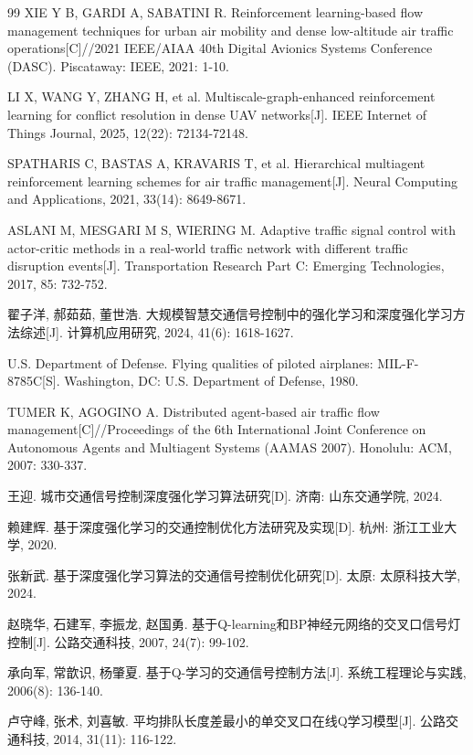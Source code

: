 \documentclass[12pt,a4paper,UTF8]{ctexart}
\begin{document}
\begin{thebibliography}{99}
 XIE Y B, GARDI A, SABATINI R. Reinforcement learning-based flow management techniques for urban air mobility and dense low-altitude air traffic operations[C]//2021 IEEE/AIAA 40th Digital Avionics Systems Conference (DASC). Piscataway: IEEE, 2021: 1-10.

 LI X, WANG Y, ZHANG H, et al. Multiscale-graph-enhanced reinforcement learning for conflict resolution in dense UAV networks[J]. IEEE Internet of Things Journal, 2025, 12(22): 72134-72148.

 SPATHARIS C, BASTAS A, KRAVARIS T, et al. Hierarchical multiagent reinforcement learning schemes for air traffic management[J]. Neural Computing and Applications, 2021, 33(14): 8649-8671.

 ASLANI M, MESGARI M S, WIERING M. Adaptive traffic signal control with actor-critic methods in a real-world traffic network with different traffic disruption events[J]. Transportation Research Part C: Emerging Technologies, 2017, 85: 732-752.

 翟子洋, 郝茹茹, 董世浩. 大规模智慧交通信号控制中的强化学习和深度强化学习方法综述[J]. 计算机应用研究, 2024, 41(6): 1618-1627.

 U.S. Department of Defense. Flying qualities of piloted airplanes: MIL-F-8785C[S]. Washington, DC: U.S. Department of Defense, 1980.

 TUMER K, AGOGINO A. Distributed agent-based air traffic flow management[C]//Proceedings of the 6th International Joint Conference on Autonomous Agents and Multiagent Systems (AAMAS 2007). Honolulu: ACM, 2007: 330-337.

 王迎. 城市交通信号控制深度强化学习算法研究[D]. 济南: 山东交通学院, 2024.

 赖建辉. 基于深度强化学习的交通控制优化方法研究及实现[D]. 杭州: 浙江工业大学, 2020.

 张新武. 基于深度强化学习算法的交通信号控制优化研究[D]. 太原: 太原科技大学, 2024.

 赵晓华, 石建军, 李振龙, 赵国勇. 基于Q-learning和BP神经元网络的交叉口信号灯控制[J]. 公路交通科技, 2007, 24(7): 99-102.

 承向军, 常歆识, 杨肇夏. 基于Q-学习的交通信号控制方法[J]. 系统工程理论与实践, 2006(8): 136-140.

 卢守峰, 张术, 刘喜敏. 平均排队长度差最小的单交叉口在线Q学习模型[J]. 公路交通科技, 2014, 31(11): 116-122.


\end{thebibliography}
\end{document}
